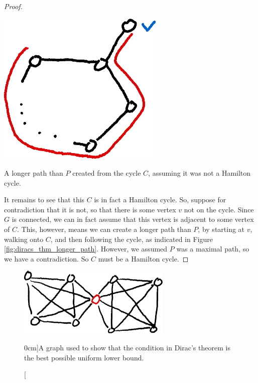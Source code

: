 \documentclass[nobib]{tufte-handout}
\begin{document}
\begin{theorem}
\begin{proof}
        \begin{marginfigure}
            \centering
            \includegraphics[width=0.6\textwidth]{graphics/L8_vx_covers_hamiltonicity_etc/diracs_thm_longer_path.png}
            \caption{A longer path than $P$ created from the cycle $C$, assuming it was not a Hamilton cycle.}
            \label{fig:diracs_thm_longer_path}
        \end{marginfigure}

        It remains to see that this $C$ is in fact a Hamilton cycle. So, suppose for contradiction that it is not, so that there is some vertex $v$ not on the cycle. Since $G$ is connected, we can in fact assume that this vertex is adjacent to some vertex of $C$. This, however, means we can create a longer path than $P$, by starting at $v$, walking onto $C$, and then following the cycle, as indicated in Figure \ref{fig:diracs_thm_longer_path}. However, we assumed $P$ was a maximal path, so we have a contradiction. So $C$ must be a Hamilton cycle.
    \end{proof}
\end{theorem}

\begin{figure}
    \centering
    \includegraphics[width=0.65\textwidth]{graphics/L8_vx_covers_hamiltonicity_etc/diracs_theorem_counterexample.png}
    \caption[][0cm]{A graph used to show that the condition in Dirac's theorem is the best possible uniform lower bound.}
    \label{fig:dirac_counterexample}
  \end{figure}
\end{document}
